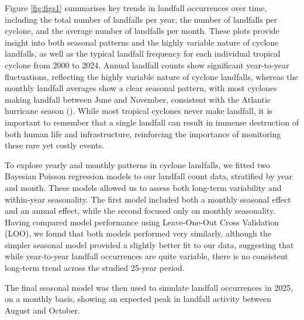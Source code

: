 \documentclass[
]{article}
\begin{document}
Figure \ref{fig:figs1} summarises key trends in landfall occurrences over time, including the total number of landfalls per year, the number of landfalls per cyclone, and the average number of landfalls per month. These plots provide insight into both seasonal patterns and the highly variable nature of cyclone landfalls, as well as the typical landfall frequency for each individual tropical cyclone from 2000 to 2024. Annual landfall counts show significant year-to-year fluctuations, reflecting the highly variable nature of cyclone landfalls, whereas the monthly landfall averages show a clear seasonal pattern, with most cyclones making landfall between June and November, consistent with the Atlantic hurricane season (). While most tropical cyclones never make landfall, it is important to remember that a single landfall can result in immense destruction of both human life and infrastructure, reinforcing the importance of monitoring these rare yet costly events.

To explore yearly and monthly patterns in cyclone landfalls, we fitted two Bayesian Poisson regression models to our landfall count data, stratified by year and month. These models allowed us to assess both long-term variability and within-year seasonality. The first model included both a monthly seasonal effect and an annual effect, while the second focused only on monthly seasonality. Having compared model performance using Leave-One-Out Cross Validation (LOO), we found that both models performed very similarly, although the simpler seasonal model provided a slightly better fit to our data, suggesting that while year-to-year landfall occurrences are quite variable, there is no consistent long-term trend across the studied 25-year period.

The final seasonal model was then used to simulate landfall occurrences in 2025, on a monthly basis, showing an expected peak in landfall activity between August and October.
\end{document}
